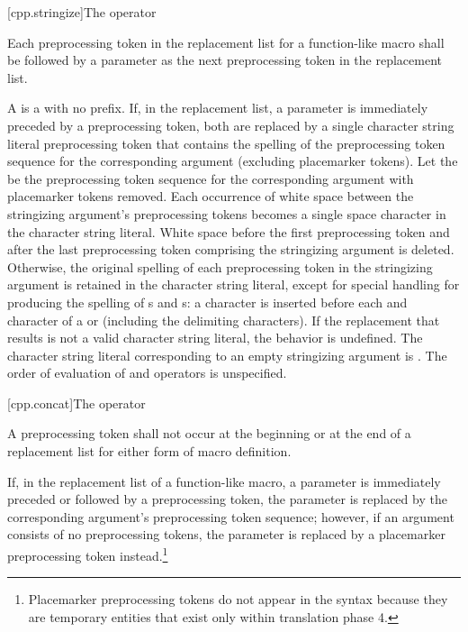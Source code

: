 [cpp.stringize]{The \tcode{\#} operator}%
%

\pnum
Each
\tcode{\#}
preprocessing token in the replacement list for a function-like
macro shall be followed by a parameter as the next preprocessing
token in the replacement list.

\pnum
A  is a  with no prefix.
If, in the replacement list, a parameter is immediately
preceded by a
\tcode{\#}
preprocessing token,
both are replaced by a single character string literal preprocessing token that
contains the spelling of the preprocessing token sequence for the
corresponding argument (excluding placemarker tokens).
Let the  be the preprocessing token sequence
for the corresponding argument with placemarker tokens removed.
Each occurrence of white space between the stringizing argument's preprocessing
tokens becomes a single space character in the character string literal.
White space before the first preprocessing token and after the last
preprocessing token comprising the stringizing argument is deleted.
Otherwise, the original spelling of each preprocessing token in the
stringizing argument is retained in the character string literal,
except for special handling for producing the spelling of
s and s:
a
\tcode{\textbackslash}
character is inserted before each
and
\tcode{\textbackslash}
character of a  or 
(including the delimiting
characters).
If the replacement that results is not a valid character string literal,
the behavior is undefined. The character string literal corresponding to
an empty stringizing argument is .
The order of evaluation of
\tcode{\#}
and
\tcode{\#\#}
operators is unspecified.

[cpp.concat]{The \tcode{\#\#} operator}%
%

\pnum
A
\tcode{\#\#}
preprocessing token shall not occur at the beginning or
at the end of a replacement list for either form
of macro definition.

\pnum
If, in the replacement list of a function-like macro, a parameter is
immediately preceded or followed by a
\tcode{\#\#}
preprocessing token, the parameter is replaced by the
corresponding argument's preprocessing token sequence; however, if an argument consists of no preprocessing tokens, the parameter is
replaced by a placemarker preprocessing token instead.\footnote{Placemarker preprocessing tokens do not appear in the syntax
because they are temporary entities that exist only within translation phase 4.}

